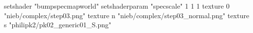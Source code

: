 setshader "bumpspecmapworld"
setshaderparam "specscale" 1 1 1
    texture 0 "nieb/complex/step03.png"
    texture n "nieb/complex/step03_normal.png"
    texture s "philipk2/pk02_generic01_S.png"